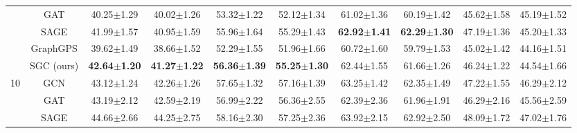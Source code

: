 \begin{table*}[ht]
{\begin{tabular}{@{}c|c|cccccccc@{}}
                      & GAT                       & 40.25$\pm$1.29                    & 40.02$\pm$1.26                    & 53.32$\pm$1.22                    & 52.12$\pm$1.34                    & 61.02$\pm$1.36                    & 60.19$\pm$1.42                   & 45.62$\pm$1.58                    & 45.19$\pm$1.52                   \\
                      & SAGE                      & 41.99$\pm$1.57                    & 40.95$\pm$1.59                    & 55.96$\pm$1.64                    & 55.29$\pm$1.43                    & \textbf{62.92$\pm$1.41}           & \textbf{62.29$\pm$1.30}          & 47.19$\pm$1.36                    & 45.20$\pm$1.33                   \\
                      & GraphGPS                  & 39.62$\pm$1.49                    & 38.66$\pm$1.52                    & 52.29$\pm$1.55                    & 51.96$\pm$1.66                    & 60.72$\pm$1.60                    & 59.79$\pm$1.53                   & 45.02$\pm$1.42                    & 44.16$\pm$1.51                   \\
                      & SGC (ours)                & \textbf{42.64$\pm$1.20}           & \textbf{41.27$\pm$1.22}           & \textbf{56.36$\pm$1.39}           & \textbf{55.25$\pm$1.30}           & 62.44$\pm$1.55                    & 61.66$\pm$1.26                   & 46.24$\pm$1.22                    & 44.54$\pm$1.66                   \\ \midrule
\multirow{5}{*}{10}   & GCN                       & 43.12$\pm$1.24                    & 42.26$\pm$1.26                    & 57.65$\pm$1.32                    & 57.16$\pm$1.39                    & 63.25$\pm$1.42                    & 62.35$\pm$1.49                   & 47.22$\pm$1.55                    & 46.29$\pm$2.12                   \\
                      & GAT                       & 43.19$\pm$2.12                    & 42.59$\pm$2.19                    & 56.99$\pm$2.22                    & 56.36$\pm$2.55                    & 62.39$\pm$2.36                    & 61.96$\pm$1.91                   & 46.29$\pm$2.16                    & 45.56$\pm$2.59                   \\
                      & SAGE                      & 44.66$\pm$2.66                    & 44.25$\pm$2.75                    & 58.16$\pm$2.30                    & 57.25$\pm$2.36                    & 63.92$\pm$2.15                    & 62.92$\pm$2.50                   & 48.09$\pm$1.72                    & 47.02$\pm$1.76                   \\

\end{tabular}}
\end{table*}
